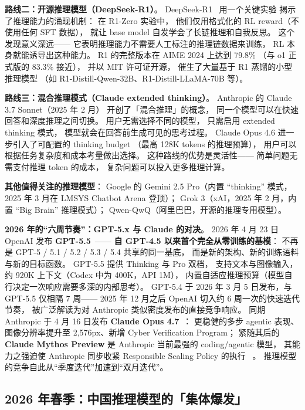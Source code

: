 \textbf{路线二：开源推理模型（DeepSeek-R1）}。
DeepSeek-R1~\cite{deepseekr1} 用一个关键实验
揭示了推理能力的涌现机制：
在 R1-Zero 实验中，
他们仅用格式化的 RL reward（不使用任何 SFT 数据），
就让 base model 自发学会了长链推理和自我反思。
这个发现意义深远——
它表明推理能力不需要人工标注的推理链数据来训练，
RL 本身就能诱导出这种能力。
R1 的完整版本在 AIME 2024 上达到 79.8\%
（与 o1 正式版的 83.3\% 接近），
并以 MIT 许可证开源，
催生了大量基于 R1 蒸馏的小型推理模型
（如 R1-Distill-Qwen-32B、R1-Distill-LLaMA-70B 等）。

\textbf{路线三：混合推理模式（Claude extended thinking）}。
Anthropic 的 Claude 3.7 Sonnet（2025 年 2 月）
开创了「混合推理」的概念，
同一个模型可以在快速回答和深度推理之间切换。
用户无需选择不同的模型，
只需启用 extended thinking 模式，
模型就会在回答前生成可见的思考过程。
Claude Opus 4.6 进一步引入了可配置的 thinking budget
（最高 128K tokens 的推理预算），
用户可以根据任务复杂度和成本考量做出选择。
这种路线的优势是灵活性——
简单问题无需支付推理 token 的成本，
复杂问题可以投入更多推理计算。

\textbf{其他值得关注的推理模型}：
Google 的 Gemini 2.5 Pro（内置 “thinking” 模式，
2025 年 3 月在 LMSYS Chatbot Arena 登顶）；
Grok 3（xAI，2025 年 2 月，内置 “Big Brain” 推理模式）；
Qwen-QwQ（阿里巴巴，开源的推理专用模型）。

\textbf{2026 年的“六周节奏”：GPT-5.x 与 Claude 的对决}。
2026 年 4 月 23 日 OpenAI 发布 \textbf{GPT-5.5}~\cite{openai_gpt55_2026}——
\textbf{自 GPT-4.5 以来首个完全从零训练的基模}：
不再是 GPT-5 / 5.1 / 5.2 / 5.3 / 5.4 共享的同一基底，
而是新的架构、新的训练语料与新的目标函数。
GPT-5.5 提供 Thinking 与 Pro 双档，
支持文本与图像输入，约 920K 上下文（Codex 中为 400K，API 1M），
内置自适应推理预算（模型自行决定一次响应需要多深的内部思考）。
GPT-5.4 于 2026 年 3 月 5 日发布，与 GPT-5.5 仅相隔 7 周——
2025 年 12 月之后 OpenAI 切入约 6 周一次的快速迭代节奏，
被广泛解读为对 Anthropic 类似密度发布的直接竞争响应。
同期 Anthropic 于 4 月 16 日发布 \textbf{Claude Opus 4.7}~\cite{anthropic_opus47_release_2026}：
更稳健的多步 agentic 表现、
图像分辨率提升至 2,576px、新增 Cyber Verification Program；
紧随其后的 \textbf{Claude Mythos Preview} 是 Anthropic 当前最强的 coding/agentic 模型，
其能力之强迫使 Anthropic 同步收紧 Responsible Scaling Policy 的执行%
~\cite{anthropic_mythos_2026}。
推理模型的竞争自此从“季度迭代”加速到“双月迭代”。

\subsection{2026 年春季：中国推理模型的「集体爆发」}

